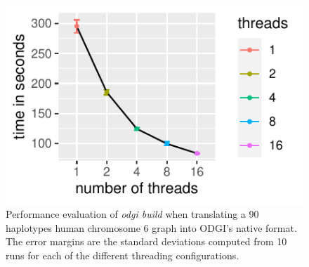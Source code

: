 \begin{figure}[h!]
	\centering
	\includegraphics[width=\linewidth]{fig/build/mean_build_time.pdf}
	\caption{Performance evaluation of \textit{odgi build} when translating a 90 haplotypes human chromosome 6 graph into ODGI's native format. The error margins are the standard deviations computed from 10 runs for each of the different threading configurations.}
	\label{fig:build}
\end{figure}
